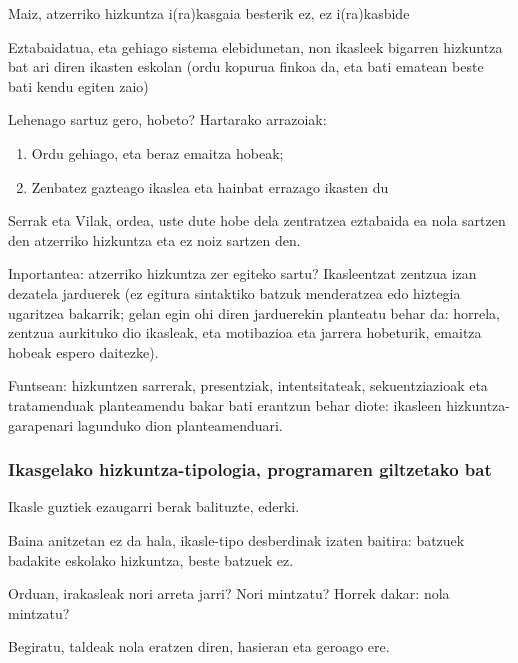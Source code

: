 \documentclass[
]{book}
\providecommand{\tightlist}{%
  \setlength{\itemsep}{0pt}\setlength{\parskip}{0pt}}
\begin{document}
Maiz, atzerriko hizkuntza i(ra)kasgaia besterik ez, ez i(ra)kasbide

Eztabaidatua, eta gehiago sistema elebidunetan, non ikasleek bigarren hizkuntza bat ari diren ikasten eskolan (ordu kopurua finkoa da, eta bati ematean beste bati kendu egiten zaio)

Lehenago sartuz gero, hobeto? Hartarako arrazoiak:

\begin{enumerate}
\def\labelenumi{\arabic{enumi}.}
\tightlist
\item
  Ordu gehiago, eta beraz emaitza hobeak;
\item
  Zenbatez gazteago ikaslea eta hainbat errazago ikasten du
\end{enumerate}

Serrak eta Vilak, ordea, uste dute hobe dela zentratzea eztabaida ea nola sartzen den atzerriko hizkuntza eta ez noiz sartzen den.

Inportantea: atzerriko hizkuntza zer egiteko sartu? Ikasleentzat zentzua izan dezatela jarduerek (ez egitura sintaktiko batzuk menderatzea edo hiztegia ugaritzea bakarrik; gelan egin ohi diren jarduerekin planteatu behar da: horrela, zentzua aurkituko dio ikasleak, eta motibazioa eta jarrera hobeturik, emaitza hobeak espero daitezke).

Funtsean: hizkuntzen sarrerak, presentziak, intentsitateak, sekuentziazioak eta tratamenduak planteamendu bakar bati erantzun behar diote: ikasleen hizkuntza-garapenari lagunduko dion planteamenduari.

\hypertarget{ikasgelako-hizkuntza-tipologia-programaren-giltzetako-bat}{%
\subsubsection*{Ikasgelako hizkuntza-tipologia, programaren giltzetako bat}\label{ikasgelako-hizkuntza-tipologia-programaren-giltzetako-bat}}

Ikasle guztiek ezaugarri berak balituzte, ederki.

Baina anitzetan ez da hala, ikasle-tipo desberdinak izaten baitira: batzuek badakite eskolako hizkuntza, beste batzuek ez.

Orduan, irakasleak nori arreta jarri? Nori mintzatu? Horrek dakar: nola mintzatu?

Begiratu, taldeak nola eratzen diren, hasieran eta geroago ere.
\end{document}

